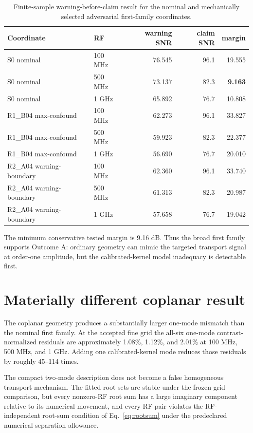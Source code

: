 \documentclass[11pt]{article}
\begin{document}
\begin{table}[H]
\centering
\caption{Finite-sample warning-before-claim result for the nominal and mechanically selected adversarial first-family coordinates.}
\label{tab:firstfamily}
\begin{tabular}{llrrr}
\toprule
Coordinate & RF & warning SNR & claim SNR & margin\\
\midrule
S0 nominal & 100 MHz & 76.545 & 96.1 & 19.555\\
S0 nominal & 500 MHz & 73.137 & 82.3 & \textbf{9.163}\\
S0 nominal & 1 GHz & 65.892 & 76.7 & 10.808\\
R1\_B04 max-confound & 100 MHz & 62.273 & 96.1 & 33.827\\
R1\_B04 max-confound & 500 MHz & 59.923 & 82.3 & 22.377\\
R1\_B04 max-confound & 1 GHz & 56.690 & 76.7 & 20.010\\
R2\_A04 warning-boundary & 100 MHz & 62.360 & 96.1 & 33.740\\
R2\_A04 warning-boundary & 500 MHz & 61.313 & 82.3 & 20.987\\
R2\_A04 warning-boundary & 1 GHz & 57.658 & 76.7 & 19.042\\
\bottomrule
\end{tabular}
\end{table}

The minimum conservative tested margin is 9.16 dB. Thus the broad first family supports Outcome A: ordinary geometry can mimic the targeted transport signal at order-one amplitude, but the calibrated-kernel model inadequacy is detectable first.

\section{Materially different coplanar result}

The coplanar geometry produces a substantially larger one-mode mismatch than the nominal first family. At the accepted fine grid the all-six one-mode contrast-normalized residuals are approximately 1.08\%, 1.12\%, and 2.01\% at 100 MHz, 500 MHz, and 1 GHz. Adding one calibrated-kernel mode reduces those residuals by roughly 45--114 times.

The compact two-mode description does not become a false homogeneous transport mechanism. The fitted root sets are stable under the frozen grid comparison, but every nonzero-RF root sum has a large imaginary component relative to its numerical movement, and every RF pair violates the RF-independent root-sum condition of Eq.~\eqref{eq:rootsum} under the predeclared numerical separation allowance.
\end{document}

